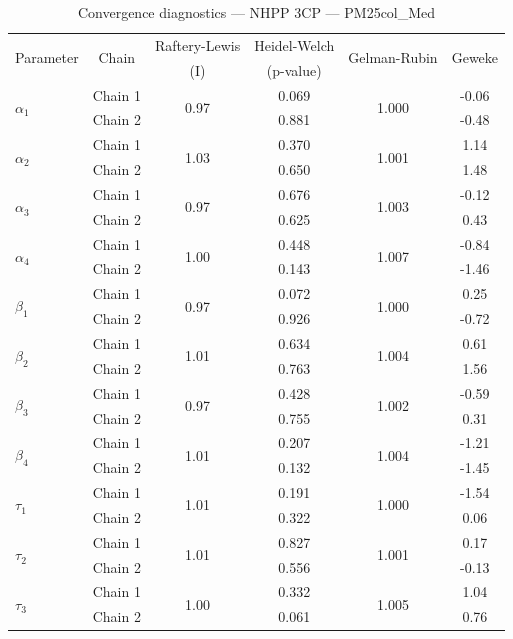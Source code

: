\begin{table}[H]
\centering
\caption{Convergence diagnostics — NHPP 3CP — PM25col_Med}
\begin{tabular}{lccccc}
\toprule
\multirow{2}{*}{Parameter} & \multirow{2}{*}{Chain} & Raftery-Lewis & Heidel-Welch & \multirow{2}{*}{Gelman-Rubin} & \multirow{2}{*}{Geweke} \\
 & & (I) & (p-value) & & (z) \\
\midrule
\multirow{2}{*}{$\alpha_1$} & Chain 1 & \multirow{2}{*}{0.97} & 0.069 & \multirow{2}{*}{1.000} & -0.06 \\
 & Chain 2 & & 0.881 & & -0.48 \\
\multirow{2}{*}{$\alpha_2$} & Chain 1 & \multirow{2}{*}{1.03} & 0.370 & \multirow{2}{*}{1.001} & 1.14 \\
 & Chain 2 & & 0.650 & & 1.48 \\
\multirow{2}{*}{$\alpha_3$} & Chain 1 & \multirow{2}{*}{0.97} & 0.676 & \multirow{2}{*}{1.003} & -0.12 \\
 & Chain 2 & & 0.625 & & 0.43 \\
\multirow{2}{*}{$\alpha_4$} & Chain 1 & \multirow{2}{*}{1.00} & 0.448 & \multirow{2}{*}{1.007} & -0.84 \\
 & Chain 2 & & 0.143 & & -1.46 \\
\midrule
\multirow{2}{*}{$\beta_1$} & Chain 1 & \multirow{2}{*}{0.97} & 0.072 & \multirow{2}{*}{1.000} & 0.25 \\
 & Chain 2 & & 0.926 & & -0.72 \\
\multirow{2}{*}{$\beta_2$} & Chain 1 & \multirow{2}{*}{1.01} & 0.634 & \multirow{2}{*}{1.004} & 0.61 \\
 & Chain 2 & & 0.763 & & 1.56 \\
\multirow{2}{*}{$\beta_3$} & Chain 1 & \multirow{2}{*}{0.97} & 0.428 & \multirow{2}{*}{1.002} & -0.59 \\
 & Chain 2 & & 0.755 & & 0.31 \\
\multirow{2}{*}{$\beta_4$} & Chain 1 & \multirow{2}{*}{1.01} & 0.207 & \multirow{2}{*}{1.004} & -1.21 \\
 & Chain 2 & & 0.132 & & -1.45 \\
\midrule
\multirow{2}{*}{$\tau_1$} & Chain 1 & \multirow{2}{*}{1.01} & 0.191 & \multirow{2}{*}{1.000} & -1.54 \\
 & Chain 2 & & 0.322 & & 0.06 \\
\multirow{2}{*}{$\tau_2$} & Chain 1 & \multirow{2}{*}{1.01} & 0.827 & \multirow{2}{*}{1.001} & 0.17 \\
 & Chain 2 & & 0.556 & & -0.13 \\
\multirow{2}{*}{$\tau_3$} & Chain 1 & \multirow{2}{*}{1.00} & 0.332 & \multirow{2}{*}{1.005} & 1.04 \\
 & Chain 2 & & 0.061 & & 0.76 \\
\bottomrule
\end{tabular}
\end{table}
